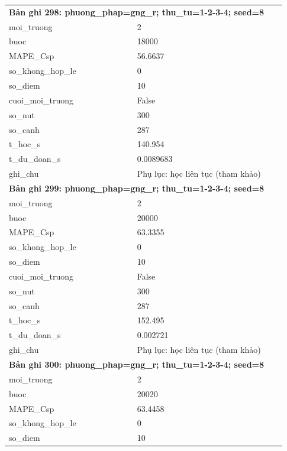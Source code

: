 \begin{longtable}{p{0.43\linewidth}p{0.50\linewidth}}
\midrule
\multicolumn{2}{p{0.95\linewidth}}{\textbf{Bản ghi 298: phuong\_phap=gng\_r; thu\_tu=1-2-3-4; seed=8}} \\
moi\_\allowbreak truong & 2 \\
buoc & 18000 \\
MAPE\_\allowbreak Csp & 56.6637 \\
so\_\allowbreak khong\_\allowbreak hop\_\allowbreak le & 0 \\
so\_\allowbreak diem & 10 \\
cuoi\_\allowbreak moi\_\allowbreak truong & False \\
so\_\allowbreak nut & 300 \\
so\_\allowbreak canh & 287 \\
t\_\allowbreak hoc\_\allowbreak s & 140.954 \\
t\_\allowbreak du\_\allowbreak doan\_\allowbreak s & 0.0089683 \\
ghi\_\allowbreak chu & Phụ lục: học liên tục (tham khảo) \\
\midrule
\multicolumn{2}{p{0.95\linewidth}}{\textbf{Bản ghi 299: phuong\_phap=gng\_r; thu\_tu=1-2-3-4; seed=8}} \\
moi\_\allowbreak truong & 2 \\
buoc & 20000 \\
MAPE\_\allowbreak Csp & 63.3355 \\
so\_\allowbreak khong\_\allowbreak hop\_\allowbreak le & 0 \\
so\_\allowbreak diem & 10 \\
cuoi\_\allowbreak moi\_\allowbreak truong & False \\
so\_\allowbreak nut & 300 \\
so\_\allowbreak canh & 287 \\
t\_\allowbreak hoc\_\allowbreak s & 152.495 \\
t\_\allowbreak du\_\allowbreak doan\_\allowbreak s & 0.002721 \\
ghi\_\allowbreak chu & Phụ lục: học liên tục (tham khảo) \\
\midrule
\multicolumn{2}{p{0.95\linewidth}}{\textbf{Bản ghi 300: phuong\_phap=gng\_r; thu\_tu=1-2-3-4; seed=8}} \\
moi\_\allowbreak truong & 2 \\
buoc & 20020 \\
MAPE\_\allowbreak Csp & 63.4458 \\
so\_\allowbreak khong\_\allowbreak hop\_\allowbreak le & 0 \\
so\_\allowbreak diem & 10 \\

\end{longtable}
